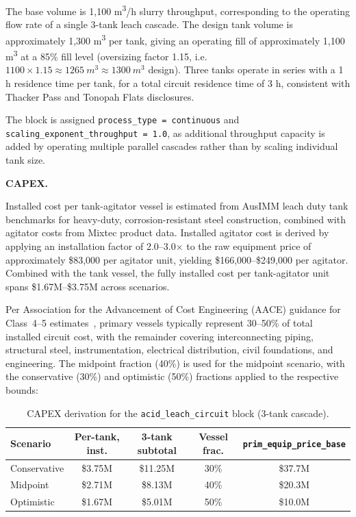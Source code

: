 The base volume is 1,100 \si{m^3/h} slurry throughput, corresponding to the operating flow rate of a single 3-tank leach cascade. The design tank volume is approximately 1,300 \si{m^3} per tank, giving an operating fill of approximately 1,100 \si{m^3} at a 85\% fill level (oversizing factor 1.15, i.e.\ $1100 \times 1.15 \approx 1265~ \si{m^3} \approx 1300~\si{m^3}$ design). Three tanks operate in series with a 1 h residence time per tank, for a total circuit residence time of 3 h, consistent with Thacker Pass and Tonopah Flats disclosures.

The block is assigned \texttt{process\_type = continuous} and \texttt{scaling\_exponent\_throughput = 1.0}, as additional throughput capacity is added by operating multiple parallel cascades rather than by scaling individual tank size.

\medskip
\noindent\textbf{CAPEX.}\quad

Installed cost per tank-agitator vessel is estimated from AusIMM leach duty tank benchmarks for heavy-duty, corrosion-resistant steel construction, combined with agitator costs from Mixtec product data. Installed agitator cost is derived by applying an installation factor of 2.0--3.0$\times$ to the raw equipment price of approximately \$83,000 per agitator unit, yielding \$166,000--\$249,000 per agitator. Combined with the tank vessel, the fully installed cost per tank-agitator unit spans \$1.67M--\$3.75M across scenarios.

Per Association for the Advancement of Cost Engineering (AACE) guidance for Class~4--5 estimates~\cite{bredehoeft47R11CostEstimate2020}, primary vessels typically represent 30--50\% of total installed circuit cost, with the remainder covering interconnecting piping, structural steel, instrumentation, electrical distribution, civil foundations, and engineering. The midpoint fraction (40\%) is used for the midpoint scenario, with the conservative (30\%) and optimistic (50\%) fractions applied to the respective bounds:

\begin{table}[h!]
\caption{CAPEX derivation for the \texttt{acid\_leach\_circuit} block (3-tank cascade).}
\centering
\begin{tabular}{lcccc}
\toprule
\textbf{Scenario} & \textbf{Per-tank, inst.} & \textbf{3-tank subtotal} & \textbf{Vessel frac.} & \texttt{prim\_equip\_price\_base} \\
\midrule
Conservative & \$3.75M & \$11.25M & 30\% & \$37.7M \\
Midpoint     & \$2.71M & \$8.13M  & 40\% & \$20.3M \\
Optimistic   & \$1.67M & \$5.01M  & 50\% & \$10.0M \\
\bottomrule
\end{tabular}
\end{table}

